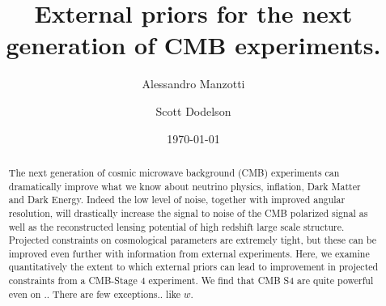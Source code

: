 \documentclass[aps,prd,reprint,superscriptaddress]{revtex4-1}
\begin{document}
\graphicspath{{images/}}

\title{External priors for the next generation of CMB experiments.}

\author{Alessandro Manzotti}
\author{Scott Dodelson}


\date{\today}
\begin{abstract}
The next generation of cosmic microwave background (CMB) experiments can dramatically improve what we know about neutrino physics, inflation, Dark Matter and Dark Energy. 
Indeed the low level of noise, together with improved angular resolution, will drastically increase the signal to noise of the CMB polarized signal as well as the reconstructed lensing potential of high redshift large scale structure. 
Projected constraints on cosmological parameters are extremely tight, but these can be improved even further with information from external experiments. Here, we examine quantitatively the extent to which external priors can lead to improvement in projected constraints from a CMB-Stage 4 experiment.
We find that CMB S4 are quite powerful even on .. There are few exceptions.. like $w$.
\end{abstract}

\pacs{}
\maketitle
\end{document}
